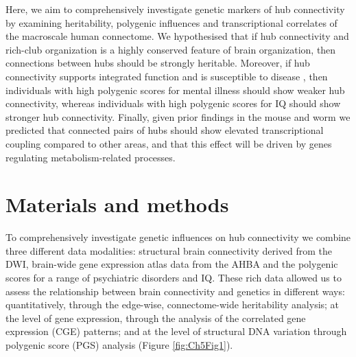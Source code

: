Here, we aim to comprehensively investigate genetic markers of hub connectivity by examining heritability, polygenic influences and transcriptional correlates of the macroscale human connectome. We hypothesised that if hub connectivity and rich-club organization is a highly conserved feature of brain organization, then connections between hubs should be strongly heritable. Moreover, if hub connectivity supports integrated function and is susceptible to disease \citep{Crossley2016a,Fornito2015}, then individuals with high polygenic scores for mental illness should show weaker hub connectivity, whereas individuals with high polygenic scores for IQ should show stronger hub connectivity. Finally, given prior findings in the mouse \citep{Fulcher2016} and worm \citep{Arnatkeviciute2018} we predicted that connected pairs of hubs should show elevated transcriptional coupling compared to other areas, and that this effect will be driven by genes regulating metabolism-related processes.

\section{Materials and methods}

To comprehensively investigate genetic influences on hub connectivity we combine three different data modalities: structural brain connectivity derived from the DWI, brain-wide gene expression atlas data from the AHBA and the polygenic scores for a range of psychiatric disorders and IQ. These rich data allowed us to assess the relationship between brain connectivity and genetics in different ways: quantitatively, through the edge-wise, connectome-wide heritability analysis; at the level of gene expression, through the analysis of the correlated gene expression (CGE) patterns; and at the level of structural DNA variation through polygenic score (PGS) analysis (Figure \ref{fig:Ch5Fig1}).

